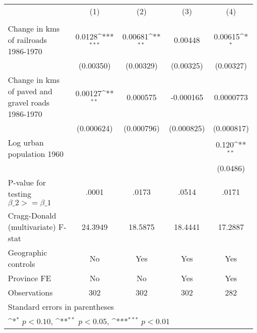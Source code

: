 {
\def\sym#1{\ifmmode^{#1}\else\(^{#1}\)\fi}
\begin{tabular}{l*{4}{c}}
\hline\hline
                &\multicolumn{1}{c}{(1)}&\multicolumn{1}{c}{(2)}&\multicolumn{1}{c}{(3)}&\multicolumn{1}{c}{(4)}\\
                &\multicolumn{1}{c}{}&\multicolumn{1}{c}{}&\multicolumn{1}{c}{}&\multicolumn{1}{c}{}\\
\hline
Change in kms of railroads 1986-1970&   0.0128\sym{***}&  0.00681\sym{**} &  0.00448         &  0.00615\sym{*}  \\
                &(0.00350)         &(0.00329)         &(0.00325)         &(0.00327)         \\
[1em]
Change in kms of paved and gravel roads 1986-1970&  0.00127\sym{**} & 0.000575         &-0.000165         &0.0000773         \\
                &(0.000624)         &(0.000796)         &(0.000825)         &(0.000817)         \\
[1em]
Log urban population 1960&                  &                  &                  &    0.120\sym{**} \\
                &                  &                  &                  & (0.0486)         \\
\hline
P-value for testing $\beta\_{2} >= \beta\_{1}$&    .0001         &    .0173         &    .0514         &    .0171         \\
Cragg-Donald (multivariate) F-stat&  24.3949         &  18.5875         &  18.4441         &  17.2887         \\
Geographic controls&       No         &      Yes         &      Yes         &      Yes         \\
Province FE     &       No         &       No         &      Yes         &      Yes         \\
Observations    &      302         &      302         &      302         &      282         \\
\hline\hline
\multicolumn{5}{l}{\footnotesize Standard errors in parentheses}\\
\multicolumn{5}{l}{\footnotesize \sym{*} \(p<0.10\), \sym{**} \(p<0.05\), \sym{***} \(p<0.01\)}\\
\end{tabular}
}
